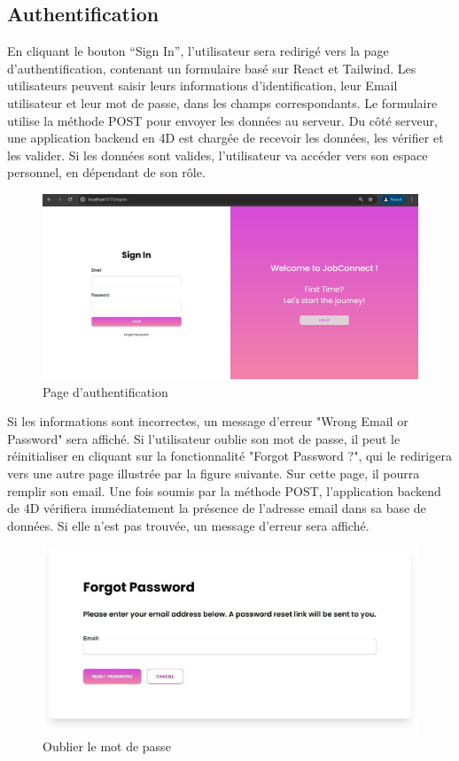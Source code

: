 \subsection{Authentification}
En cliquant le bouton “Sign In”, l’utilisateur sera redirigé vers la page d’authentification, contenant un formulaire basé sur React et Tailwind. Les utilisateurs peuvent saisir leurs  informations  d’identification, leur Email utilisateur et leur mot de passe, dans les champs correspondants. Le formulaire utilise la  méthode  POST  pour  envoyer  les données au  serveur. Du  côté serveur, une  application backend en  4D  est  chargée de recevoir les données, les vérifier  et les valider. Si les données sont valides, l’utilisateur va accéder vers son espace personnel, en dépendant de son rôle.
\newline
\begin{figure}[htbp]
   \centering
   \includegraphics[scale=0.5]{screens/signin.jpg} 
   \caption{Page d'authentification}
   \label{fig:accueil}
\end{figure}

Si les informations sont incorrectes, un message d’erreur "Wrong Email or Password" sera affiché. Si l’utilisateur oublie son mot de passe, il peut le réinitialiser en cliquant sur la fonctionnalité "Forgot Password  ?",  qui  le redirigera vers une autre page illustrée par la figure suivante. Sur cette page, il pourra remplir son  email. Une  fois soumis par  la  méthode POST, l'application backend de 4D vérifiera immédiatement la présence de l'adresse email dans sa base de données. Si elle n'est pas trouvée, un message d’erreur sera affiché.
\newline
\begin{figure}[htbp]
   \centering
   \includegraphics[scale=0.6]{screens/forgot.jpg} 
   \caption{Oublier le mot de passe}
   \label{fig:forgotPass}
\end{figure}
\vspace{5cm}


